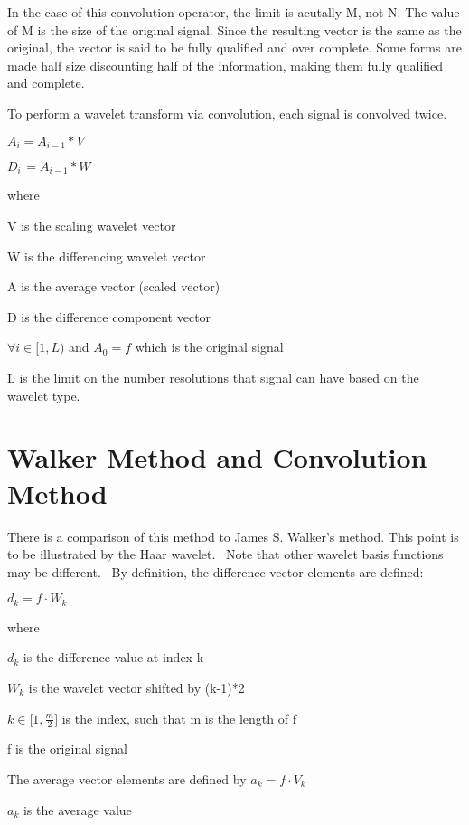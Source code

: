 \documentclass{article}
\begin{document}
In the case of this convolution operator, the limit is acutally M, not N.
The value of M is the size of the original signal. Since the resulting
vector is the same as the original, the vector is said to be fully qualified
and over complete. Some forms are made half size discounting half of the
information, making them fully qualified and complete.

To perform a wavelet transform via convolution, each signal is convolved
twice. \ 

$A_{i}=A_{i-1}\ast V$

$D_{i\,}=A_{i-1}\ast W$

\qquad where

\qquad \qquad V is the scaling wavelet vector

\qquad \qquad W is the differencing wavelet vector

\qquad \qquad A is the average vector (scaled vector)

\qquad \qquad D is the difference component vector

\qquad \qquad $\forall i\in \lbrack 1,L)$ and $A_{0}=f$ which is the
original signal

\qquad \qquad L is the limit on the number resolutions that signal can have
based on the wavelet type.

\bigskip

\section{Walker Method and Convolution Method}

There is a comparison of this method to James S. Walker's method. This point
is to be illustrated by the Haar wavelet. \ Note that other wavelet basis
functions may be different. \ By definition, the difference vector elements
are defined:

$d_{k}=f\cdot W_{k}$

\qquad where

\qquad \qquad $d_{k}$ is the difference value at index k

\qquad \qquad $W_{k}$ is the wavelet vector shifted by (k-1)*2

\qquad \qquad $k\in \lbrack 1,\frac{m}{2}]$ is the index, such that m is the
length of f

\qquad \qquad f is the original signal

The average vector elements are defined by $a_{k}=f\cdot V_{k}$

\qquad $a_{k}$ is the average value
\end{document}
